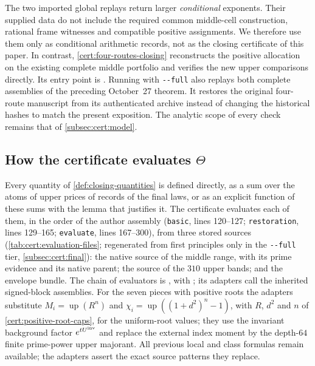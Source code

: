 The two imported global replays return larger \emph{conditional}
exponents. Their supplied data do not include the required common
middle-cell construction, rational frame witnesses and compatible
positive assignments. We therefore use them only as conditional
arithmetic records, not as the closing certificate of this paper.
In contrast, \cref{cert:four-routes-closing} reconstructs the
positive allocation on the existing complete middle portfolio and
verifies the new upper comparisons directly. Its entry point is
. Running
 with
\texttt{-{}-full} also replays
both complete assemblies of the preceding October~27 theorem. It restores
the original four-route manuscript from its authenticated archive
instead of changing the historical hashes to match the present
exposition. The analytic scope of every check remains that of
\cref{subsec:cert:model}.

\subsection{How the certificate evaluates \texorpdfstring{$\Theta$}{Theta}}
\label{subsec:cert:evaluation}
\begingroup\sloppy

Every quantity of \cref{def:closing-quantities} is defined directly, as a sum
over the atoms of upper prices of records of the final laws, or as an explicit
function of these sums with the lemma that justifies it. The certificate
evaluates each of them, in the order of the author assembly
 (\texttt{basic},
lines 120--127; \texttt{restoration}, lines 129--165; \texttt{evaluate},
lines 167--300), from three stored sources
(\cref{tab:cert:evaluation-files}; regenerated from first
principles only in the \texttt{-{}-full} tier,
\cref{subsec:cert:final}): the native source of the middle range, with
its prime evidence and its native parent; the source of the $310$ upper bands;
and the envelope bundle. The chain of evaluators is
, with
; its adapters call the inherited
signed-block assemblies. For the seven pieces with positive roots
the adapters substitute $M_i=\operatorname{up}(R^n)$ and
$\chi_i=\operatorname{up}((1+d^2)^n-1)$, with $R$, $d^2$ and $n$
of \cref{cert:positive-root-caps}, for the uniform-root values;
they use the invariant background factor $e^{tU^{\mathrm{inv}}}$ and replace
the external index moment by the depth-$64$ finite prime-power
upper majorant. All previous
local and class formulas remain available; the adapters assert the exact
source patterns they replace.


